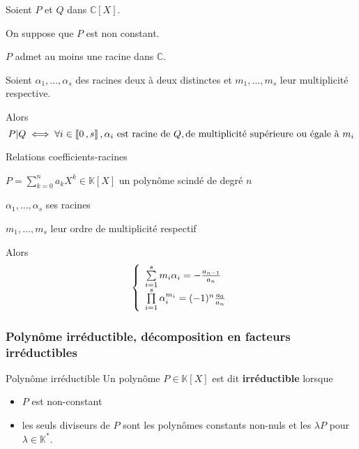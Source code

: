     \begin{coro}{}{}
        Soient $P$ et $Q$ dans $\mathbb{C}[X]$. 

        On suppose que $P$ est non constant.
    
        \begin{alors}
            \item $P$ admet au moins une racine dans $\mathbb{C}$.
            \item Soient $\alpha_1,\ldots,\alpha_s$ des racines deux à deux distinctes et $m_1,\ldots,m_s$ leur multiplicité respective. 
            
            Alors 
            \[ P | Q \iff \forall i \in \left\llbracket 0 \, , s \right\rrbracket, \alpha_i \text{ est racine de } Q, \text{de multiplicité supérieure ou égale à } m_i \]
        \end{alors}
    \end{coro}
    
    \begin{prop}{Relations coefficients-racines}{}
        \begin{soient}
            \item $P = \sum\limits_{k=0}^n a_k X^k \in \mathbb{K}[X]$ un polynôme scindé de degré $n$
            \item $\alpha_1,\ldots,\alpha_s$ ses racines
            \item $m_1,\ldots,m_s$ leur ordre de multiplicité respectif
        \end{soient}
    
        Alors \[ \et{\sum\limits_{i=1}^s m_i \alpha_i = -\frac{a_{n-1}}{a_n}}{\prod\limits_{i=1}^s \alpha_i^{m_i} = (-1)^n \frac{a_0}{a_n}} \]
    \end{prop}

    \subsubsection{Polynôme irréductible, décomposition en facteurs irréductibles}

    \begin{defi}{Polynôme irréductible}{}
        Un polynôme $P \in \mathbb{K}[X]$ est dit \textbf{irréductible} lorsque 
        \begin{itemize}
            \item $P$ est non-constant
            \item les seuls diviseurs de $P$ sont les polynômes constants non-nuls et les $\lambda P$ pour $\lambda \in \mathbb{K}^*$.
        \end{itemize}
    \end{defi}

